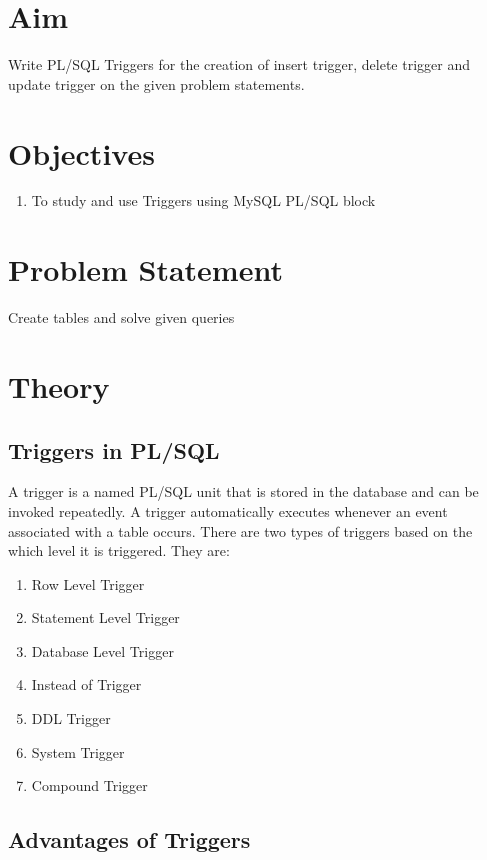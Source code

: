 \documentclass[11pt]{article}
\begin{document}
\tableofcontents
\thispagestyle{empty}
\clearpage

\setcounter{page}{1}

\section{Aim}
Write PL/SQL Triggers for the creation of insert trigger, delete trigger and update trigger on the
given problem statements.

\section{Objectives}
\begin{enumerate}
    \item To study and use Triggers using MySQL PL/SQL block
\end{enumerate}


\section{Problem Statement}
Create tables and solve given queries

\section{Theory}

\subsection{Triggers in PL/SQL}
A trigger is a named PL/SQL unit that is stored in the database and can be invoked repeatedly. A trigger automatically executes whenever an event associated with a table occurs. There are two types of triggers based on the which level it is triggered. They are:

\begin{enumerate}
    \item Row Level Trigger
    \item Statement Level Trigger
    \item Database Level Trigger
    \item Instead of Trigger
    \item DDL Trigger
    \item System Trigger
    \item Compound Trigger
\end{enumerate}

\subsection{Advantages of Triggers}
\end{document}
